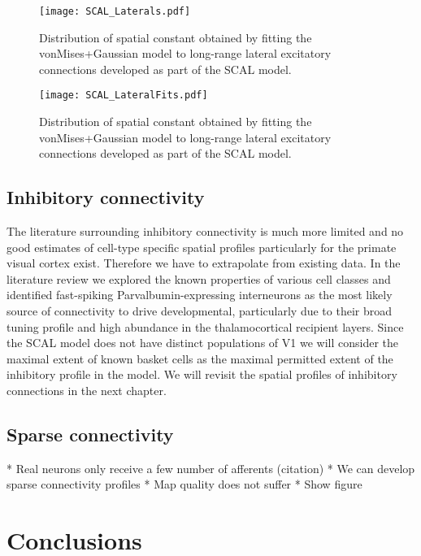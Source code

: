\begin{figure}
	\centering
        \texttt{[image: SCAL\_Laterals.pdf]}
	\caption{Distribution of spatial constant obtained by fitting
          the \cite{Buzas2006} vonMises+Gaussian model to long-range
          lateral excitatory connections developed as part of the SCAL
          model.}
	\label{LatFits}
\end{figure}

\begin{figure}
	\centering
        \texttt{[image: SCAL\_LateralFits.pdf]}
	\caption{Distribution of spatial constant obtained by fitting
          the \cite{Buzas2006} vonMises+Gaussian model to long-range
          lateral excitatory connections developed as part of the SCAL
          model.}
	\label{LatDist}
\end{figure}

\subsection{Inhibitory connectivity}

The literature surrounding inhibitory connectivity is much more
limited and no good estimates of cell-type specific spatial profiles
particularly for the primate visual cortex exist. Therefore we have to
extrapolate from existing data. In the literature review we explored
the known properties of various cell classes and identified
fast-spiking Parvalbumin-expressing interneurons as the most likely
source of connectivity to drive developmental, particularly due to
their broad tuning profile and high abundance in the thalamocortical
recipient layers. Since the SCAL model does not have distinct
populations of V1 we will consider the maximal extent of known basket
cells as the maximal permitted extent of the inhibitory profile in the
model. We will revisit the spatial profiles of inhibitory connections
in the next chapter.

\subsection{Sparse connectivity}

* Real neurons only receive a few number of afferents (citation)
* We can develop sparse connectivity profiles
* Map quality does not suffer
* Show figure


\section{Conclusions}

